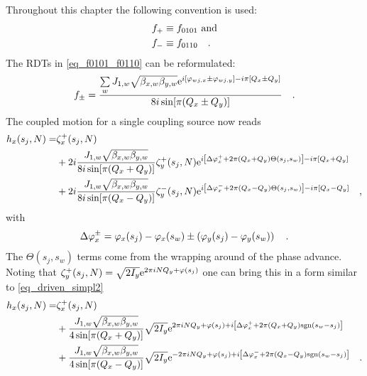 Throughout this chapter the following convention is used:
%
\begin{align}
    f_+ &\equiv f_{0101} \text{ and}\notag \\
    f_- &\equiv f_{0110} 
    \quad .
\end{align}
%
The RDTs in \eqref{eq_f0101_f0110} can be reformulated:
%
\begin{equation}
    f_\pm = 
    \frac{
        \sum\limits_w J_{1,w} \sqrt{\beta_{x,w}\beta_{y,w}}
        \text{e}^{
            i\left[\varphi_{wj,x} \pm \varphi_{wj,y}\right]
            -i\pi\left[Q_x\pm Q_y\right]
        }
    }{
        8i\sin[\pi(Q_x\pm Q_y)]
    }
    \quad .
\end{equation}
%
The coupled motion for a single coupling source now reads
%
\begin{align}
    h_x(s_j,N) =& \zeta_x^+(s_j,N) \notag \\
    &+2i\frac{
         J_{1,w} \sqrt{\beta_{x,w}\beta_{y,w}}
    }{
        8i\sin[\pi(Q_x + Q_y)]
    }
    \zeta_y^+(s_j,N)
        \text{e}^{
            i\left[\Delta\varphi_x^+ + 2\pi (Q_x+Q_y) \Theta(s_j,s_w)\right]
            -i\pi\left[Q_x + Q_y\right]
        }
        \notag \\
    &+2i\frac{
         J_{1,w} \sqrt{\beta_{x,w}\beta_{y,w}}
    }{
        8i\sin[\pi(Q_x - Q_y)]
    }
    \zeta_y^-(s_j,N)
        \text{e}^{
            i\left[\Delta\varphi_x^- + 2\pi( Q_x-Q_y) \Theta(s_j,s_w)\right]
            -i\pi\left[Q_x - Q_y\right]
        }
        \quad ,
\end{align}
%
with 
%
\begin{equation}
    \Delta\varphi_x^\pm = \varphi_x(s_j) - \varphi_x(s_w) \pm \left(\varphi_y(s_j) - \varphi_y(s_w)\right)
    \quad .
\end{equation}
%
The $\Theta(s_j,s_w)$ terms come from the wrapping around of the phase advance. Noting that 
$\zeta_y^+(s_j,N) = \sqrt{2I_y}\text{e}^{2\pi i N Q_y + \varphi(s_j)}$
one can bring this in a form similar to \eqref{eq_driven_simpl2}
%
\begin{align}
    h_x(s_j,N) =& \zeta_x^+(s_j,N) \notag \\
    &+\frac{
         J_{1,w} \sqrt{\beta_{x,w}\beta_{y,w}}
    }{
        4\sin[\pi(Q_x + Q_y)]
    }
    \sqrt{2I_y}
    \text{e}^{
        2\pi i N Q_y + \varphi(s_j)
        +i\left[\Delta\varphi_x^+ + 2\pi (Q_x+Q_y) \text{sgn}(s_w-s_j)\right]
    }
        \notag \\
    &+\frac{
        J_{1,w} \sqrt{\beta_{x,w}\beta_{y,w}}
    }{
        4\sin[\pi(Q_x - Q_y)]
    }
    \sqrt{2I_y}
    \text{e}^{
        -2\pi i N Q_y + \varphi(s_j)
        +i\left[\Delta\varphi_x^- + 2\pi (Q_x-Q_y) \text{sgn}(s_w-s_j)\right]
    }
    \quad .
\end{align}
